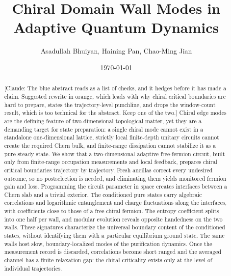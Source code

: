 \documentclass[aps,prb,10pt,twocolumn,superscriptaddress,longbibliography,floatfix]{revtex4-2}
\newcommand{\claudeadd}[1]{{\color{orange}#1}}
\newcommand{\claudecom}[1]{{\color{ForestGreen}[Claude: #1]}}
\begin{document}
\raggedbottom

\title{Chiral Domain Wall Modes in Adaptive Quantum Dynamics}
\author{Asadullah Bhuiyan, Haining Pan, Chao-Ming Jian}
\noaffiliation
\date{\today}

\begin{abstract}
\claudecom{The blue abstract reads as a list of checks, and it hedges before it has made a claim. Suggested rewrite in orange, which leads with why chiral critical boundaries are hard to prepare, states the trajectory-level punchline, and drops the window-count result, which is too technical for the abstract. Keep one of the two.}
\claudeadd{Chiral edge modes are the defining feature of two-dimensional topological matter, yet they are a demanding target for state preparation: a single chiral mode cannot exist in a standalone one-dimensional lattice, strictly local finite-depth unitary circuits cannot create the required Chern bulk, and finite-range dissipation cannot stabilize it as a pure steady state. We show that a two-dimensional adaptive free-fermion circuit, built only from finite-range occupation measurements and local feedback, prepares chiral critical boundaries trajectory by trajectory. Fresh ancillas correct every undesired outcome, so no postselection is needed, and eliminating them yields monitored fermion gain and loss. Programming the circuit parameter in space creates interfaces between a Chern slab and a trivial exterior. The conditioned pure states carry algebraic correlations and logarithmic entanglement and charge fluctuations along the interfaces, with coefficients close to those of a free chiral fermion. The entropy coefficient splits into one half per wall, and modular evolution reveals opposite handedness on the two walls. These signatures characterize the universal boundary content of the conditioned states, without identifying them with a particular equilibrium ground state. The same walls host slow, boundary-localized modes of the purification dynamics. Once the measurement record is discarded, correlations become short ranged and the averaged channel has a finite relaxation gap: the chiral criticality exists only at the level of individual trajectories.}


\end{abstract}
\end{document}
